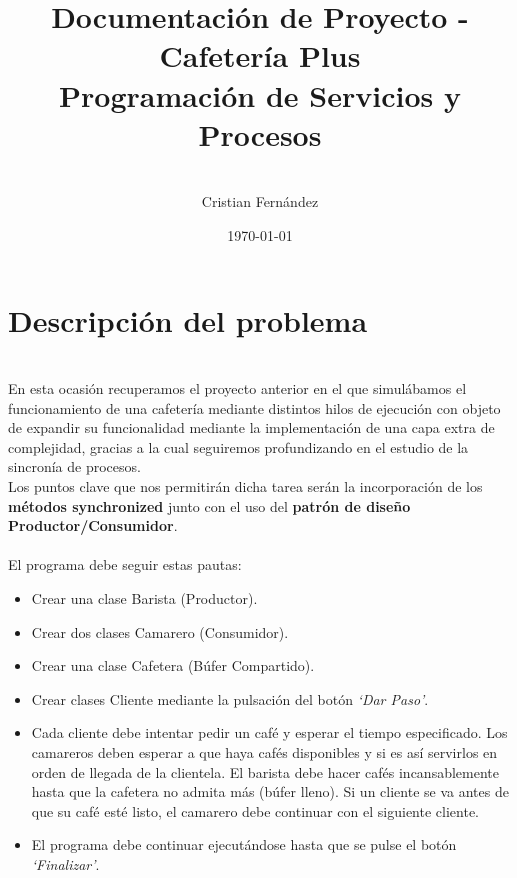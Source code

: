 \documentclass[12pt, a4paper, titlepage]{article}
\title{\LARGE \textbf{Documentación de Proyecto - Cafetería Plus} \\[2ex] \Large Programación de Servicios y Procesos}
\author{\\[20ex]Cristian Fernández}
\date{\today}
\begin{document}
\maketitle

\doublespacing
\tableofcontents %
\newpage

\section{Descripción del problema}
\noindent \\En esta ocasión recuperamos el proyecto anterior en el que simulábamos el funcionamiento de una cafetería mediante distintos hilos de ejecución con objeto de
expandir su funcionalidad mediante la implementación de una capa extra de complejidad, gracias a la cual seguiremos profundizando en el estudio de la sincronía de procesos. \\
Los puntos clave que nos permitirán dicha tarea serán la incorporación de los \textbf{métodos synchronized} junto con el uso del \textbf{patrón de diseño Productor/Consumidor}. \\ \\
El programa debe seguir estas pautas:\\
\begin{itemize}
    \item Crear una clase Barista (Productor).
    \item Crear dos clases Camarero (Consumidor).
    \item Crear una clase Cafetera (Búfer Compartido).
    \item Crear clases Cliente mediante la pulsación del botón \textit{`Dar Paso'}.
    \item Cada cliente debe intentar pedir un café y esperar el tiempo especificado. Los camareros deben esperar a que haya cafés disponibles y si es así servirlos en orden de
    llegada de la clientela. El barista debe hacer cafés incansablemente hasta que la cafetera no admita más (búfer lleno).
    Si un cliente se va antes de que su café esté listo, el camarero debe continuar con el siguiente cliente.
    \item El programa debe continuar ejecutándose hasta que se pulse el botón \textit{`Finalizar'}.
\end{itemize}
\newpage
\end{document}
